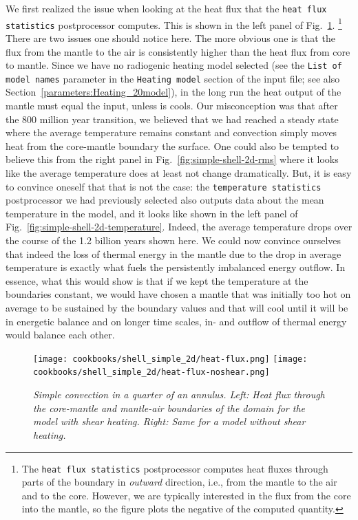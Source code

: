 \documentclass{article}
\begin{document}
We first realized the issue when looking at the heat flux that the
\texttt{heat flux statistics} postprocessor computes. This is shown in the left
panel of Fig.~\ref{fig:simple-shell-2d-heatflux}.%
\footnote{The \texttt{heat flux statistics} postprocessor computes heat fluxes
through parts of the boundary in \textit{outward} direction, i.e., from the
mantle to the air and to the core. However, we are typically interested in the
flux from the core into the mantle, so the figure plots the negative of the
computed quantity.}
There are two issues one should notice here.
The more obvious one is that the flux from the mantle to the air is consistently
higher than the heat flux from core to mantle. Since we have no radiogenic
heating model selected (see the \texttt{List of model names}
parameter in the \texttt{Heating model} section of the input file; see also
Section~\ref{parameters:Heating_20model}), in the long run the heat output
of the mantle must equal the input, unless is cools. Our misconception was that
after the 800 million year transition, we believed that we had reached a steady
state where the average temperature remains constant and convection simply
moves heat from the core-mantle boundary the surface. One could also be tempted
to believe this from the right panel in Fig.~\ref{fig:simple-shell-2d-rms} where
it looks like the average temperature does at least not change dramatically.
But, it is easy to convince oneself that that is not the case: the
\texttt{temperature statistics} postprocessor we had previously selected also
outputs data about the mean temperature in the model, and it looks like shown in
the left panel of Fig.~\ref{fig:simple-shell-2d-temperature}. Indeed, the
average temperature drops over the course of the 1.2 billion years shown here.
We could now convince ourselves that indeed the loss of thermal
energy in the mantle due to the drop in average temperature is exactly what
fuels the persistently imbalanced energy outflow. In essence, what this would
show is that if we kept the temperature at the boundaries constant, we would
have chosen a mantle that was initially too hot on average to be sustained by
the boundary values and that will cool until it will be in energetic balance and
on longer time scales, in- and outflow of thermal energy would balance each
other.


\begin{figure}[tb]
  \texttt{[image: cookbooks/shell\_simple\_2d/heat-flux.png]}
  \hfill
  \texttt{[image: cookbooks/shell\_simple\_2d/heat-flux-noshear.png]}
  \caption{\it Simple convection in a quarter of an annulus. Left: Heat flux
  through the core-mantle and mantle-air boundaries of the domain for the
  model with shear heating. Right: Same for a model without shear heating.}
  \label{fig:simple-shell-2d-heatflux}
\end{figure}
\end{document}
